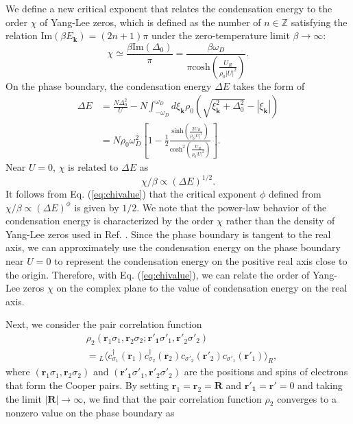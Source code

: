 \documentclass[aps,prl,twocolumn,nofootinbib,superscriptaddress,notitlepage,longbibliography]{revtex4-1}
\begin{document}
	We define a new critical exponent that relates the condensation energy to the order $\chi$ of Yang-Lee zeros,
	which is defined as the number of $n\in\mathbb{Z}$ satisfying the relation
	$\mathrm{Im}(\beta E_{\bm{k}})=(2n+1)\pi$ under the zero-temperature limit $\beta\to\infty$:
	\begin{equation}
	\chi\simeq\frac{\beta\text{Im}(\Delta_{0})}{\pi}=\frac{\beta\omega_{D}}{\pi\text{cosh}(\frac{U_{R}}{\rho_{0}|U|^{2}})}.
	\end{equation}
	  On the phase boundary, the condensation energy $\Delta E$ takes the form of
	 \begin{align}
	 \Delta E&=  \frac{N\Delta_0^2}{U}
	 - N \int_{- \omega_D}^{\omega_D} d \xi_{\bm{k}} \rho_0 \left( \sqrt{\xi_{\bm{k}}^2 +
	 	\Delta_0^2} - | \xi_{\bm{k}} | \right)\nonumber\\
	 &=N \rho_0 \omega_D^2 \left[ 1 - \frac{1}{2} \frac{\text{sinh} \left(\frac{2 U_R}{\rho_0 | U |^2} \right)}{\text{cosh}^2 \left( \frac{U_R}{\rho_0| U |^2} \right)} \right].
	 \end{align}
	 Near $U=0$, $\chi$ is related to $\Delta E$ as
	\begin{equation}
	\chi/\beta\propto(\Delta E)^{1/2}.
	\label{eq:chivalue}
	\end{equation}
	 It follows from Eq. (\ref{eq:chivalue}) that the critical exponent $\phi$ defined from $\chi/\beta\propto(\Delta E)^{\phi}$ is given by $1/2$. We note that the power-law behavior of the condensation energy is characterized by the order $\chi$ rather than the density of Yang-Lee zeros used in Ref. \cite{Fisher:1978vn}. Since the phase boundary is tangent to the real axis, we can approximately use the condensation energy on the phase boundary near $U=0$ to represent the condensation energy on the positive real axis close to the origin. Therefore, with Eq. (\ref{eq:chivalue}), we can relate the order of Yang-Lee zeros $\chi$ on the complex plane to the value of condensation energy on the real axis. 
	
	Next, we consider the pair correlation function
	\begin{align}
	&\rho_{2}(\bm{r}_{1}\sigma_{1},\bm{r}_{2}\sigma_{2};\bm{r'_{1}}\sigma'_{1},\bm{r'}_{2}\sigma'_{2})\nonumber\\
	&={}_{L}\langle c_{\sigma_{1}}^{\dagger}(\bm{r}_{1})c_{\sigma_{2}}^{\dagger}(\bm{r}_{2})c_{\sigma'_{2}}(\bm{r'}_{2})c_{\sigma'_{1}}(\bm{r'}_{1})\rangle_{R},
	\end{align}
	where $(\bm{r}_{1}\sigma_{1},\bm{r}_{2}\sigma_{2})$ and $(\bm{r'_{1}}\sigma'_{1},\bm{r'}_{2}\sigma'_{2})$ are the positions and spins of electrons that form the Cooper pairs. By setting
	$\bm{r}_{1}=\bm{r}_{2}=\bm{R}$ and $\bm{r'_{1}}=\bm{r'}=0$ and taking
	the limit $|\bm{R}|\rightarrow\infty$, we find that the pair correlation function
	$\rho_2$ converges to a nonzero value on the phase boundary as
	
\end{document}
